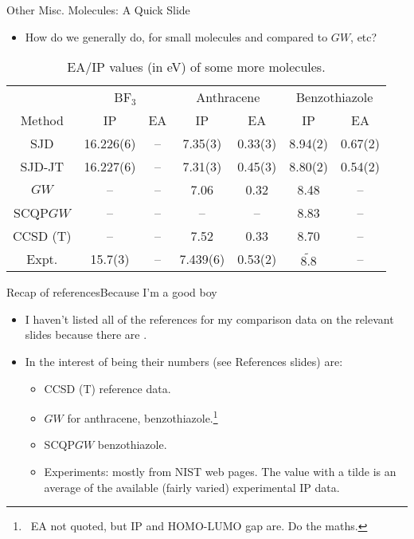 \documentclass[12pt, pdf, hyperref={draft}, usenames, dvipsnames,
aspectratio=169]{beamer}
\newcommand{\red}[1]{{\bf\color{LancsRed}{#1}}}
\newcommand{\green}[1]{{\bf\color{ForestGreen}{#1}}}
\begin{document}
\begin{frame}{Other Misc. Molecules: A Quick Slide}

\begin{itemize}
  \item How do we generally do, for small molecules and compared to
  $GW$, etc?
\end{itemize}

\begin{table}[H]
\centering
\caption{EA/IP values (in eV) of some more molecules.}\label{tab:molecules}
\begin{tabular}{ccccccc}
 & \multicolumn{2}{c}{BF$_3$} & \multicolumn{2}{c}{Anthracene} &
 \multicolumn{2}{c}{Benzothiazole} \\
Method & IP      & EA      & IP      & EA      & IP      & EA      \\
SJD    &16.226(6)& --      & 7.35(3) & 0.33(3) & 8.94(2) & 0.67(2) \\
SJD-JT &16.227(6)& --      & 7.31(3) & 0.45(3) & 8.80(2) & 0.54(2) \\
$GW$   &  --     & --      & 7.06    & 0.32    & 8.48    & --      \\
SCQP$GW$& --     & --      & --      & --      & 8.83    & --      \\
CCSD (T)& --     & --      & 7.52    & 0.33    & 8.70    & --      \\
Expt.  & 15.7(3) & --      & 7.439(6)& 0.53(2) &$\tilde{8.8}$& --
\end{tabular}
\end{table}
\end{frame}


\begin{frame}{Recap of references}{Because I'm a good boy}
\begin{itemize}
  \item I haven't listed all of the references for my comparison data on the
  relevant slides because there are \red{too many}.

  \item In the interest of being \green{good} their numbers (see References
  slides) are:

  \begin{itemize}
    \item CCSD (T) reference data.

    \item $GW$ for anthracene,
    benzothiazole.\footnote{\ EA not quoted, but IP and
    HOMO-LUMO gap are. Do the maths.}

    \item SCQP$GW$ benzothiazole.

    \item Experiments: mostly from NIST web
    pages. The value with a tilde is an average of the
    available (fairly varied) experimental IP data.
  \end{itemize}
\end{itemize}
\end{frame}
\end{document}
